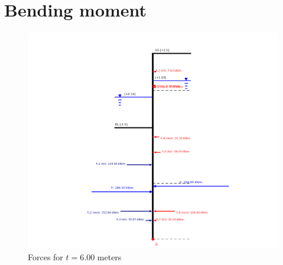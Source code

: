 \section{Bending moment}

\begin{figure}[H]
    \centering
    \includegraphics[width=0.90\linewidth]{figures/appendix-i/point_O_forces_combined.png}
    \caption{Forces for $t = 6.00$ meters}
    \label{fig:appendix_moments_balance_6000}
\end{figure}

